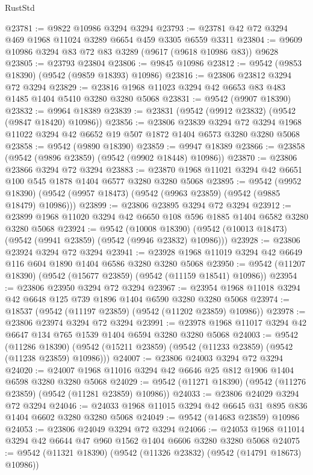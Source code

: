 \begin{lexlean}{RustStd}
\begin{coremodule}
@23781 := @9822 @10986 @3294 @3294
@23793 := @23781 @42 @72 @3294 @469 @1968 @11024 @3289 @6654 @459 @3305 @6559 @3311
@23804 := @9609 @10986 @3294 @83 @72 @83 @3289 (@9617 (@9618 @10986 @83)) @9628
@23805 := @23793 @23804
@23806 := @9845 @10986
@23812 := @9542 (@9853 @18390) (@9542 (@9859 @18393) @10986)
@23816 := @23806 @23812 @3294 @72 @3294
@23829 := @23816 @1968 @11023 @3294 @42 @6653 @83 @483 @1485 @1404 @5410 @3280 @3280 @5068
@23831 := @9542 (@9907 @18390)
@23832 := @9964 @18389
@23839 := @23831 (@9542 (@9912 @23832) (@9542 (@9847 @18420) @10986))
@23856 := @23806
    @23839
    @3294
    @72
    @3294
    @1968
    @11022
    @3294
    @42
    @6652
    @19
    @507
    @1872
    @1404
    @6573
    @3280
    @3280
    @5068
@23858 := @9542 (@9890 @18390)
@23859 := @9947 @18389
@23866 := @23858 (@9542 (@9896 @23859) (@9542 (@9902 @18448) @10986))
@23870 := @23806 @23866 @3294 @72 @3294
@23883 := @23870 @1968 @11021 @3294 @42 @6651 @100 @545 @1878 @1404 @6577 @3280 @3280 @5068
@23895 := @9542
    (@9952 @18390)
    (@9542 (@9957 @18473) (@9542 (@9963 @23859) (@9542 (@9885 @18479) @10986)))
@23899 := @23806 @23895 @3294 @72 @3294
@23912 := @23899 @1968 @11020 @3294 @42 @6650 @108 @596 @1885 @1404 @6582 @3280 @3280 @5068
@23924 := @9542
    (@10008 @18390)
    (@9542 (@10013 @18473) (@9542 (@9941 @23859) (@9542 (@9946 @23832) @10986)))
@23928 := @23806 @23924 @3294 @72 @3294
@23941 := @23928 @1968 @11019 @3294 @42 @6649 @116 @604 @1890 @1404 @6586 @3280 @3280 @5068
@23950 := @9542 (@11207 @18390) (@9542 (@15677 @23859) (@9542 (@11159 @18541) @10986))
@23954 := @23806 @23950 @3294 @72 @3294
@23967 := @23954 @1968 @11018 @3294 @42 @6648 @125 @739 @1896 @1404 @6590 @3280 @3280 @5068
@23974 := @18537 (@9542 (@11197 @23859) (@9542 (@11202 @23859) @10986))
@23978 := @23806 @23974 @3294 @72 @3294
@23991 := @23978 @1968 @11017 @3294 @42 @6647 @134 @765 @1539 @1404 @6594 @3280 @3280 @5068
@24003 := @9542
    (@11286 @18390)
    (@9542 (@15211 @23859) (@9542 (@11233 @23859) (@9542 (@11238 @23859) @10986)))
@24007 := @23806 @24003 @3294 @72 @3294
@24020 := @24007 @1968 @11016 @3294 @42 @6646 @25 @812 @1906 @1404 @6598 @3280 @3280 @5068
@24029 := @9542 (@11271 @18390) (@9542 (@11276 @23859) (@9542 (@11281 @23859) @10986))
@24033 := @23806 @24029 @3294 @72 @3294
@24046 := @24033 @1968 @11015 @3294 @42 @6645 @31 @895 @836 @1404 @6602 @3280 @3280 @5068
@24049 := @9542 (@14683 @23859) @10986
@24053 := @23806 @24049 @3294 @72 @3294
@24066 := @24053 @1968 @11014 @3294 @42 @6644 @47 @960 @1562 @1404 @6606 @3280 @3280 @5068
@24075 := @9542 (@11321 @18390) (@9542 (@11326 @23832) (@9542 (@14791 @18673) @10986))

\end{coremodule}
\end{lexlean}
